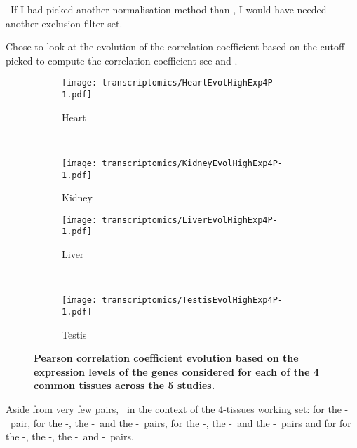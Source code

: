 \NB\ If I had picked another normalisation method than \FPKM,
I would have needed another exclusion filter set.







Chose to look at the evolution of the correlation coefficient based on
the cutoff picked to compute the correlation coefficient see 
and .

\begin{sidewaysfigure}[htpb]
    \centering
    \begin{subfigure}[b]{0.50\textwidth}\centering
        \texttt{[image: transcriptomics/HeartEvolHighExp4P-1.pdf]}
        \caption{Heart}\label{fig:CorHighExpHeart4T}
    \end{subfigure}%
~%
    \begin{subfigure}[b]{0.50\textwidth}\centering
        \texttt{[image: transcriptomics/KidneyEvolHighExp4P-1.pdf]}
        \caption{Kidney}\label{fig:CorHighExpKidney4T}
    \end{subfigure}

    \begin{subfigure}[b]{0.50\textwidth}\centering
        \texttt{[image: transcriptomics/LiverEvolHighExp4P-1.pdf]}
        \caption{Liver}\label{fig:CorHighExpLiver4T}
    \end{subfigure}%
~%
    \begin{subfigure}[b]{0.50\textwidth}\centering
        \texttt{[image: transcriptomics/TestisEvolHighExp4P-1.pdf]}
        \caption{Testis}\label{fig:CorHighExpTestis4T}
    \end{subfigure}
    \caption[Pearson correlation coefficient evolution based on the expression
    levels of the genes considered for each of the 4 common tissues]{%
\label{fig:CorHighExp4T}\textbf{Pearson correlation coefficient evolution
    based on the expression levels of the genes considered for each of the 4
    common tissues across the 5 studies.}}
\end{sidewaysfigure}

Aside from very few pairs,
\ie\ in the context of the 4-tissues working set:
 for the \uhlen{}-\gtex\ pair,
 for the \uhlen{}-\gtex, the \castle{}-\uhlen\ and the \castle{}-\gtex\
pairs,
 for the \vt{}-\ibm, the \ibm{}-\uhlen\ and the \ibm{}-\uhlen\ pairs
and for \tissue{Testis} for the \ibm{}-\uhlen, the \vt{}-\gtex, the \vt{}-\uhlen\
and \uhlen{}-\gtex\ pairs.

